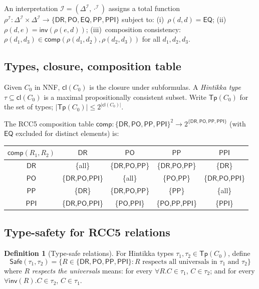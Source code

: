 \documentclass[a4paper,11pt]{article}
\theoremstyle{definition}
\newtheorem{definition}[theorem]{Definition}
\newcommand{\DR}{\ensuremath{\mathsf{DR}}}
\newcommand{\PO}{\ensuremath{\mathsf{PO}}}
\newcommand{\EQ}{\ensuremath{\mathsf{EQ}}}
\newcommand{\PP}{\ensuremath{\mathsf{PP}}}
\newcommand{\PPI}{\ensuremath{\mathsf{PPI}}}
\newcommand{\inv}{\ensuremath{\mathsf{inv}}}
\newcommand{\comp}{\ensuremath{\mathsf{comp}}}
\newcommand{\cl}{\ensuremath{\mathsf{cl}}}
\newcommand{\Tp}{\ensuremath{\mathsf{Tp}}}
\newcommand{\Safe}{\ensuremath{\mathsf{Safe}}}
\newcommand{\interp}{\ensuremath{\mathcal{I}}}
\newcommand{\DeltaI}{\ensuremath{\Delta^{\mathcal{I}}}}
\begin{document}
An interpretation $\interp = (\DeltaI, \cdot^{\interp})$ assigns a
total function $\rho^{\interp}: \DeltaI \times \DeltaI \to
\{\DR, \PO, \EQ, \PP, \PPI\}$ subject to: (i)~$\rho(d,d) = \EQ$;
(ii)~$\rho(d,e) = \inv(\rho(e,d))$; (iii)~composition consistency:
$\rho(d_1, d_3) \in \comp(\rho(d_1, d_2), \rho(d_2, d_3))$ for all
$d_1, d_2, d_3$.

\subsection{Types, closure, composition table}

Given $C_0$ in NNF, $\cl(C_0)$ is the closure under subformulas.
A \emph{Hintikka type} $\tau \subseteq \cl(C_0)$ is a maximal
propositionally consistent subset.  Write $\Tp(C_0)$ for the set of
types; $|\Tp(C_0)| \le 2^{|\cl(C_0)|}$.

The RCC5 composition table
$\comp: \{\DR,\PO,\PP,\PPI\}^2 \to 2^{\{\DR,\PO,\PP,\PPI\}}$ (with
$\EQ$ excluded for distinct elements) is:

\begin{center}
\renewcommand{\arraystretch}{1.15}
\begin{tabular}{c|cccc}
$\comp(R_1, R_2)$ & $\DR$ & $\PO$ & $\PP$ & $\PPI$ \\
\hline
$\DR$ & \{all\} & \{\DR,\PO,\PP\} & \{\DR,\PO,\PP\} & \{\DR\} \\
$\PO$ & \{\DR,\PO,\PPI\} & \{all\} & \{\PO,\PP\} & \{\DR,\PO,\PPI\} \\
$\PP$ & \{\DR\} & \{\DR,\PO,\PP\} & \{\PP\} & \{all\} \\
$\PPI$ & \{\DR,\PO,\PPI\} & \{\PO,\PPI\} & \{\PO,\PP,\PPI\} & \{\PPI\} \\
\end{tabular}
\end{center}

\subsection{Type-safety for RCC5 relations}\label{sec:type-safety}

\begin{definition}[Type-safe relations]\label{def:safe}
For Hintikka types $\tau_1, \tau_2 \in \Tp(C_0)$, define
\[
\Safe(\tau_1, \tau_2) = \{R \in \{\DR,\PO,\PP,\PPI\} :
\text{$R$ respects all universals in $\tau_1$ and $\tau_2$}\}
\]
where $R$ \emph{respects the universals} means: for every
$\forall R.C \in \tau_1$, $C \in \tau_2$; and for every
$\forall\inv(R).C \in \tau_2$, $C \in \tau_1$.
\end{definition}
\end{document}
